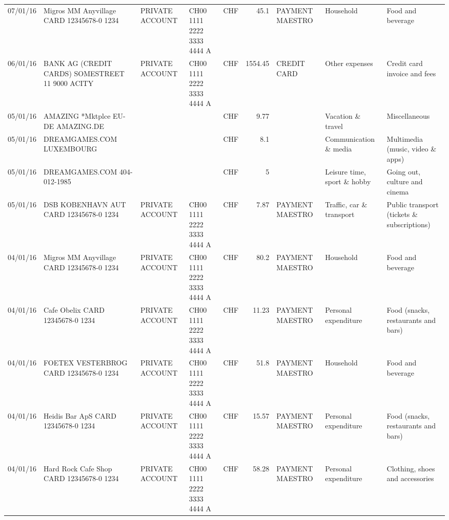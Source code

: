 \begin{landscape}
\begin{table}[h]
\begin{center}
\begin{tabular}{rllllrlll}
		07/01/16 & Migros MM Anyvillage CARD 12345678-0 1234 & PRIVATE ACCOUNT & CH00 1111 2222 3333 4444 A & CHF   & 45.1  & PAYMENT MAESTRO & Household & Food and beverage \\
		06/01/16 & BANK AG (CREDIT CARDS) SOMESTREET 11 9000 ACITY & PRIVATE ACCOUNT & CH00 1111 2222 3333 4444 A & CHF   & 1554.45 & CREDIT CARD & Other expenses & Credit card invoice and fees \\
		05/01/16 & AMAZING *Mktplce EU-DE    AMAZING.DE &       &       & CHF   & 9.77  &       & Vacation \& travel & Miscellaneous \\
		05/01/16 & DREAMGAMES.COM           LUXEMBOURG &       &       & CHF   & 8.1   &       & Communication \& media & Multimedia (music, video \& apps) \\
		05/01/16 & DREAMGAMES.COM           404-012-1985 &       &       & CHF   & 5     &       & Leisure time, sport \& hobby & Going out, culture and cinema \\
		05/01/16 & DSB KOBENHAVN AUT CARD 12345678-0 1234 & PRIVATE ACCOUNT & CH00 1111 2222 3333 4444 A & CHF   & 7.87  & PAYMENT MAESTRO & Traffic, car \& transport & Public transport (tickets \& subscriptions) \\
		04/01/16 & Migros MM Anyvillage CARD 12345678-0 1234 & PRIVATE ACCOUNT & CH00 1111 2222 3333 4444 A & CHF   & 80.2  & PAYMENT MAESTRO & Household & Food and beverage \\
		04/01/16 & Cafe Obelix CARD 12345678-0 1234 & PRIVATE ACCOUNT & CH00 1111 2222 3333 4444 A & CHF   & 11.23 & PAYMENT MAESTRO & Personal expenditure & Food (snacks, restaurants and bars) \\
		04/01/16 & FOETEX VESTERBROG CARD 12345678-0 1234 & PRIVATE ACCOUNT & CH00 1111 2222 3333 4444 A & CHF   & 51.8  & PAYMENT MAESTRO & Household & Food and beverage \\
		04/01/16 & Heidis Bar ApS CARD 12345678-0 1234 & PRIVATE ACCOUNT & CH00 1111 2222 3333 4444 A & CHF   & 15.57 & PAYMENT MAESTRO & Personal expenditure & Food (snacks, restaurants and bars) \\
		04/01/16 & Hard Rock Cafe Shop CARD 12345678-0 1234 & PRIVATE ACCOUNT & CH00 1111 2222 3333 4444 A & CHF   & 58.28 & PAYMENT MAESTRO & Personal expenditure & Clothing, shoes and accessories \\
	\end{tabular}%
		\end{center}
	\label{tab:addlabel}%
\end{table}%

\end{landscape}

